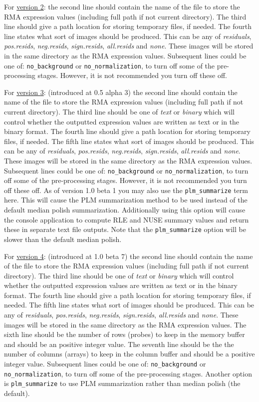 \documentclass[11pt]{report}
\begin{document}
For \underline{version 2}: the second line should contain the name of the file to store the RMA expression values (including full path if not current directory). The third line should give a path location for storing temporary files, if needed. The fourth line states what sort of images should be produced. This can be any of {\it residuals},  {\it pos.resids}, {\it neg.resids}, {\it sign.resids}, {\it all.resids} and {\it none}. These images will be stored in the same directory as the RMA expression values. Subsequent lines could be one of: {\tt no\_background} or {\tt no\_normalization}, to turn off some of the pre-processing stages. However, it is not recommended you turn off these off.

For \underline{version 3}: (introduced at 0.5 alpha 3) the second line should contain the name of the file to store the RMA expression values (including full path if not current directory). The third line should be one of {\it text} or {\it binary} which will control whether the outputted expression values are written as text or in the binary format. The fourth line should give a path location for storing temporary files, if needed. The fifth line states what sort of images should be produced. This can be any of {\it residuals},  {\it pos.resids}, {\it neg.resids}, {\it sign.resids}, {\it all.resids} and {\it none}. These images will be stored in the same directory as the RMA expression values. Subsequent lines could be one of: {\tt no\_background} or {\tt no\_normalization}, to turn off some of the pre-processing stages. However, it is not recommended you turn off these off. As of version 1.0 beta 1 you may also use the {\tt plm\_summarize} term here. This will cause the PLM summarization method to be used instead of the default median polish summarization. Additionally using this option will cause the console application to compute RLE and NUSE summary values and return these in separate text file outputs. Note that the {\tt plm\_summarize} option will be slower than the default median polish.

For \underline{version 4}: (introduced at 1.0 beta 7) the second line should contain the name of the file to store the RMA expression values (including full path if not current directory). The third line should be one of {\it text} or {\it binary} which will control whether the outputted expression values are written as text or in the binary format. The fourth line should give a path location for storing temporary files, if needed. The fifth line states what sort of images should be produced. This can be any of {\it residuals},  {\it pos.resids}, {\it neg.resids}, {\it sign.resids}, {\it all.resids} and {\it none}. These images will be stored in the same directory as the RMA expression values. The sixth line should be the number of rows (probes) to keep in the memory buffer and should be an positive integer value. The seventh line should be the the number of columns (arrays) to keep in the column buffer and should be a positive integer value.  Subsequent lines could be one of: {\tt no\_background} or {\tt no\_normalization}, to turn off some of the pre-processing stages. Another option is {\tt plm\_summarize} to use PLM summarization rather than median polish (the default).
\end{document}
